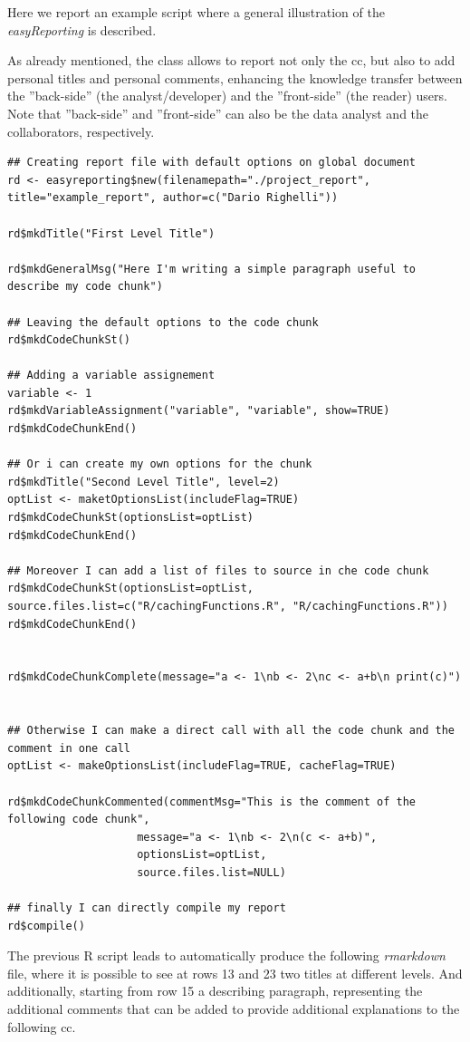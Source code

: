 Here we report an example script where a general illustration of the \textit{easyReporting} is described.

As already mentioned, the class allows to report not only the \gls{cc}, but also to add personal titles and personal comments, enhancing the knowledge transfer between the ''back-side'' (the analyst/developer) and the ''front-side'' (the reader) users.
Note that ''back-side'' and ''front-side'' can also be the data analyst and the collaborators, respectively.

\begin{lstlisting}
## Creating report file with default options on global document
rd <- easyreporting$new(filenamepath="./project_report", title="example_report", author=c("Dario Righelli"))

rd$mkdTitle("First Level Title")

rd$mkdGeneralMsg("Here I'm writing a simple paragraph useful to describe my code chunk")

## Leaving the default options to the code chunk
rd$mkdCodeChunkSt()

## Adding a variable assignement
variable <- 1
rd$mkdVariableAssignment("variable", "variable", show=TRUE)
rd$mkdCodeChunkEnd()

## Or i can create my own options for the chunk
rd$mkdTitle("Second Level Title", level=2)
optList <- maketOptionsList(includeFlag=TRUE)
rd$mkdCodeChunkSt(optionsList=optList)
rd$mkdCodeChunkEnd()

## Moreover I can add a list of files to source in che code chunk
rd$mkdCodeChunkSt(optionsList=optList, source.files.list=c("R/cachingFunctions.R", "R/cachingFunctions.R"))
rd$mkdCodeChunkEnd()


rd$mkdCodeChunkComplete(message="a <- 1\nb <- 2\nc <- a+b\n print(c)")


## Otherwise I can make a direct call with all the code chunk and the comment in one call
optList <- makeOptionsList(includeFlag=TRUE, cacheFlag=TRUE)

rd$mkdCodeChunkCommented(commentMsg="This is the comment of the following code chunk",
                    message="a <- 1\nb <- 2\n(c <- a+b)",
                    optionsList=optList,
                    source.files.list=NULL)

## finally I can directly compile my report
rd$compile()
\end{lstlisting}
 
The previous R script leads to automatically produce the following \textit{rmarkdown} file, where it is possible to see at rows 13 and 23 two titles at different levels.
And additionally, starting from row 15 a describing paragraph, representing the additional comments that can be added to provide additional explanations to the following \gls{cc}.

